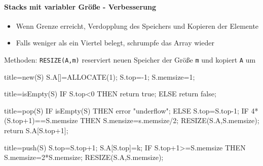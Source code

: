 \documentclass[
    ngerman,
    color=3b,
    load_common, %
    summary,
    boxarc,
]{tuda_summary}
\begin{document}
\paragraph{Stacks mit variabler Grö\ss{}e - Verbesserung}\mbox{}
\begin{idea}\mbox{}
    \begin{itemize}
        \item Wenn Grenze erreicht, Verdopplung des Speichers und Kopieren der Elemente
        \item Falls weniger als ein Viertel belegt, schrumpfe das Array wieder
    \end{itemize}
\end{idea}
Methoden:
\texttt{RESIZE(A,m)} reserviert neuen Speicher der Grö\ss e \texttt{m} und kopiert \texttt{A} um\\
\begin{minipage}[t]{.5\textwidth}\mbox{}
    \begin{codeBlock}[autogobble]{title=new(S)}
        S.A[]=ALLOCATE(1);
        S.top=-1;
        S.memsize=1;
    \end{codeBlock}
\end{minipage}
\begin{minipage}[t]{.5\textwidth}\mbox{}
    \begin{codeBlock}[autogobble]{title=isEmpty(S)}
        IF S.top<0 THEN
            return true;
        ELSE
            return false;
    \end{codeBlock}
\end{minipage}
\begin{minipage}[t]{.5\textwidth}\mbox{}
    \begin{codeBlock}[autogobble]{title=pop(S)}
        IF isEmpty(S) THEN
            error "underflow";
        ELSE
            S.top=S.top-1;
            IF 4*(S.top+1)==S.memsize THEN
                S.mensize=s.memsize/2;
                RESIZE(S.A,S.memsize);
            return S.A[S.top+1];
    \end{codeBlock}
\end{minipage}
\begin{minipage}[t]{.5\textwidth}\mbox{}
    \begin{codeBlock}[autogobble]{title=push(S)}
        S.top=S.top+1;
        S.A[S.top]=k;
        IF S.top+1>=S.memsize THEN
            S.memsize=2*S.memsize;
            RESIZE(S.A,S.memsize);
    \end{codeBlock}
\end{minipage}
\end{document}
